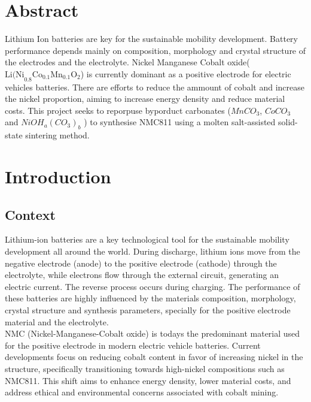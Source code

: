 \documentclass{article}
\begin{document}
\date{
  \vspace{2cm}
  \small{January 24, 2024}
}




\maketitle
\newpage
\setcounter{page}{1}  %
\tableofcontents

\newpage
\section{Abstract}
Lithium Ion batteries are key for the sustainable mobility development. 
Battery performance depends mainly on composition, morphology and crystal structure 
of the electrodes and the electrolyte. Nickel Manganese Cobalt oxide(\(\text{Li(Ni}_{0.8}\text{Co}_{0.1}\text{Mn}_{0.1}\text{O}_{2} \)) is currently
dominant as a positive electrode for electric vehicles batteries. 
There are efforts to reduce the ammount of cobalt and increase the nickel proportion,
aiming to increase energy density and reduce material costs. This project seeks 
to reporpuse byporduct carbonates (\({MnCO}_{3}\), \({CoCO}_{3}\) and \({NiOH}_{a}{({CO}_{3})}_{b}\) ) 
to synthesise NMC811 using a molten salt-assisted solid-state sintering method.\\
\section {Introduction}

\subsection{Context}

Lithium-ion batteries are a key technological tool for the sustainable mobility development all around the world.
During discharge, lithium ions move from the negative electrode (anode) to the positive electrode (cathode) through the electrolyte, while electrons flow through the external circuit, generating an electric current. The reverse process occurs during charging.
The performance of these batteries are highly influenced by the materials composition, morphology, crystal structure and synthesis parameters, specially for the positive electrode material and the electrolyte.\cite{topo} \\

NMC (Nickel-Manganese-Cobalt oxide) is todays the predominant material used for the positive electrode in modern electric vehicle batteries. Current developments focus on reducing cobalt content in favor of increasing nickel in the structure, specifically transitioning towards high-nickel compositions such as NMC811. This shift aims to enhance energy density, lower material costs, and address ethical and environmental concerns associated with cobalt mining. \cite{NMC811} \cite{NMCintro} \\
\end{document}
